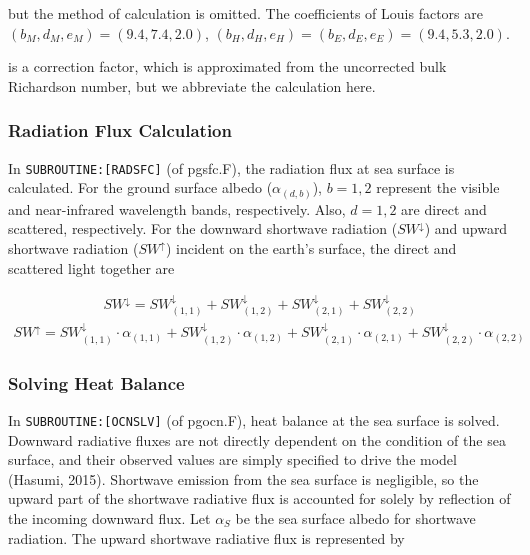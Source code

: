 but the method of calculation is omitted. The coefficients of Louis
factors are \(( b_M, d_M, e_M ) = ( 9.4, 7.4, 2.0 )\),
\(( b_H, d_H, e_H ) = ( b_E, d_E, e_E ) = ( 9.4, 5.3, 2.0 )\).

is a correction factor, which is approximated from the uncorrected bulk
Richardson number, but we abbreviate the calculation here.

\hypertarget{radiation-flux-calculation}{%
\subsubsection{Radiation Flux
Calculation}\label{radiation-flux-calculation}}

In \texttt{SUBROUTINE:{[}RADSFC{]}} (of pgsfc.F), the radiation flux at
sea surface is calculated. For the ground surface albedo
(\(\alpha_{(d,b)}\)), \(b=1,2\) represent the visible and near-infrared
wavelength bands, respectively. Also, \(d=1,2\) are direct and
scattered, respectively. For the downward shortwave radiation
(\(SW^\downarrow\)) and upward shortwave radiation (\(SW^\uparrow\))
incident on the earth's surface, the direct and scattered light together
are

\begin{eqnarray}
    SW^\downarrow = SW^\downarrow_{(1,1)}+SW^\downarrow_{(1,2)}+SW^\downarrow_{(2,1)}+SW^\downarrow_{(2,2)}
\end{eqnarray} \begin{eqnarray}
SW^\uparrow = SW^\downarrow_{(1,1)}\cdot\alpha_{(1,1)}+SW^\downarrow_{(1,2)}\cdot\alpha_{(1,2)}+SW^\downarrow_{(2,1)}\cdot\alpha_{(2,1)}+SW^\downarrow_{(2,2)}\cdot\alpha_{(2,2)}
\end{eqnarray}

\hypertarget{solving-heat-balance}{%
\subsubsection{Solving Heat Balance}\label{solving-heat-balance}}

In \texttt{SUBROUTINE:{[}OCNSLV{]}} (of pgocn.F), heat balance at the
sea surface is solved. Downward radiative fluxes are not directly
dependent on the condition of the sea surface, and their observed values
are simply specified to drive the model (Hasumi, 2015). Shortwave
emission from the sea surface is negligible, so the upward part of the
shortwave radiative flux is accounted for solely by reflection of the
incoming downward flux. Let \(\alpha _S\) be the sea surface albedo for
shortwave radiation. The upward shortwave radiative flux is represented
by

